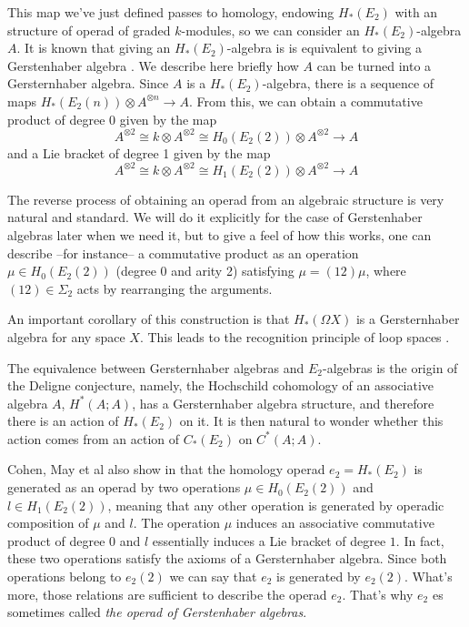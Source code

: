 \documentclass[TFM.tex]{subfiles}
\begin{document}
This map we've just defined passes to homology, endowing $H_*(E_2)$ with an structure of operad of graded $k$-modules, so we can consider an $H_*(E_2)$-algebra $A$. It is known that giving an $H_*(E_2)$-algebra is is equivalent to giving a Gerstenhaber algebra \cite{cuentas}. We describe here briefly how $A$ can be turned into a Gersternhaber algebra. Since $A$ is a $H_*(E_2)$-algebra, there is a sequence of maps $H_*(E_2(n))\otimes A^{\otimes n}\to A$. From this, we can obtain a commutative product of degree 0 given by the map
\[
A^{\otimes 2}\cong k\otimes A^{\otimes 2}\cong H_0(E_2(2))\otimes A^{\otimes 2}\to A
\]
and a Lie bracket of degree 1 given by the map
\[
A^{\otimes 2}\cong k\otimes A^{\otimes 2}\cong H_1(E_2(2))\otimes A^{\otimes 2}\to A
\]

The reverse process of obtaining an operad from an algebraic structure is very natural and standard. We will do it explicitly for the case of Gerstenhaber algebras later when we need it, but to give a feel of how this works, one can describe --for instance-- a commutative product as an operation $\mu\in H_0(E_2(2))$ (degree 0 and arity 2) satisfying $\mu=(12)\mu$, where $(12)\in\Sigma_2$ acts by rearranging the arguments. 

An important corollary of this construction is that $H_*(\Omega X)$ is a Gersternhaber algebra for any space $X$. This leads to the recognition principle of loop spaces \cite{May}.

The equivalence between Gersternhaber algebras and $E_2$-algebras is the origin of the Deligne conjecture, namely, the Hochschild cohomology of an associative algebra $A$, $H^*(A;A)$, has a Gersternhaber algebra structure, and therefore there is an action of $H_*(E_2)$ on it. It is then natural to wonder whether this action comes from an action of $C_*(E_2)$ on $C^*(A;A)$. 

Cohen, May et al also show in \cite{cuentas} that the homology operad $e_2=H_*(E_2)$ is generated as an operad by two operations $\mu\in H_0(E_2(2))$ and $l\in H_1(E_2(2))$, meaning that any other operation is generated by operadic composition of $\mu$ and $l$. The operation $\mu$ induces an associative commutative product of degree 0  and $l$ essentially induces a Lie bracket of degree $1$. In fact, these two operations satisfy the axioms of a Gersternhaber algebra. Since both operations belong to $e_2(2)$ we can say that $e_2$ is generated by $e_2(2)$. What's more, those relations are sufficient to describe the operad $e_2$. That's why $e_2$ es sometimes called \emph{the operad of Gerstenhaber algebras}. %


\end{document}
